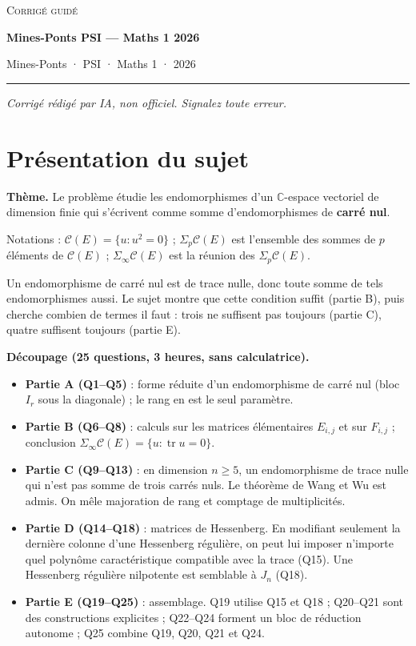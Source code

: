 \documentclass[11pt,a4paper]{article}
\providecommand{\tightlist}{\setlength{\itemsep}{0pt}\setlength{\parskip}{0pt}}
\begin{document}
\thispagestyle{plain}
\begin{center}
  {\small\scshape Corrigé guidé}\par\smallskip
  {\LARGE\bfseries Mines-Ponts PSI — Maths 1 2026\par}\medskip
  {\large Mines-Ponts · PSI · Maths 1 · 2026\par}
\end{center}
\vspace{2pt}\hrule\vspace{8pt}

\emph{Corrigé rédigé par IA, non officiel. Signalez toute erreur.}

\hypertarget{pruxe9sentation-du-sujet}{%
\section{Présentation du sujet}\label{pruxe9sentation-du-sujet}}

\textbf{Thème.} Le problème étudie les endomorphismes d'un \(\mathbb C\)-espace vectoriel de dimension finie qui s'écrivent comme somme d'endomorphismes de \textbf{carré nul}.

Notations : \(\mathcal C(E)=\{u:u^2=0\}\) ; \(\Sigma_p\mathcal C(E)\) est l'ensemble des sommes de \(p\) éléments de \(\mathcal C(E)\) ; \(\Sigma_\infty\mathcal C(E)\) est la réunion des \(\Sigma_p\mathcal C(E)\).

Un endomorphisme de carré nul est de trace nulle, donc toute somme de tels endomorphismes aussi. Le sujet montre que cette condition suffit (partie B), puis cherche combien de termes il faut : trois ne suffisent pas toujours (partie C), quatre suffisent toujours (partie E).

\textbf{Découpage (25 questions, 3 heures, sans calculatrice).}

\begin{itemize}
\tightlist
\item
  \textbf{Partie A (Q1--Q5)} : forme réduite d'un endomorphisme de carré nul (bloc \(I_r\) sous la diagonale) ; le rang en est le seul paramètre.
\item
  \textbf{Partie B (Q6--Q8)} : calculs sur les matrices élémentaires \(E_{i,j}\) et sur \(F_{i,j}\) ; conclusion \(\Sigma_\infty\mathcal C(E)=\{u:\operatorname{tr}u=0\}\).
\item
  \textbf{Partie C (Q9--Q13)} : en dimension \(n\geqslant5\), un endomorphisme de trace nulle qui n'est pas somme de trois carrés nuls. Le théorème de Wang et Wu est admis. On mêle majoration de rang et comptage de multiplicités.
\item
  \textbf{Partie D (Q14--Q18)} : matrices de Hessenberg. En modifiant seulement la dernière colonne d'une Hessenberg régulière, on peut lui imposer n'importe quel polynôme caractéristique compatible avec la trace (Q15). Une Hessenberg régulière nilpotente est semblable à \(J_n\) (Q18).
\item
  \textbf{Partie E (Q19--Q25)} : assemblage. Q19 utilise Q15 et Q18 ; Q20--Q21 sont des constructions explicites ; Q22--Q24 forment un bloc de réduction autonome ; Q25 combine Q19, Q20, Q21 et Q24.
\end{itemize}
\end{document}
